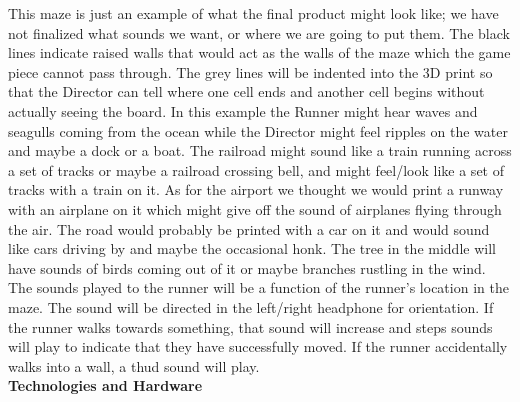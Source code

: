 \documentclass[12pt]{article}
\begin{document}
\indent This maze is just an example of what the final product might look like; we have not finalized what sounds we want, or where we are going to put them.  The black lines indicate raised walls that would act as the walls of the maze which the game piece cannot pass through.  The grey lines will be indented into the 3D print so that the Director can tell where one cell ends and another cell begins without actually seeing the board.  In this example the Runner might hear waves and seagulls coming from the ocean while the Director might feel ripples on the water and maybe a dock or a boat.  The railroad might sound like a train running across a set of tracks or maybe a railroad crossing bell, and might feel/look like a set of tracks with a train on it.  As for the airport we thought we would print a runway with an airplane on it which might give off the sound of airplanes flying through the air.  The road would probably be printed with a car on it and would sound like cars driving by and maybe the occasional honk.  The tree in the middle will have sounds of birds coming out of it or maybe branches rustling in the wind.\\
\indent The sounds played to the runner will be a function of the runner's location in the maze. The sound will be directed in the left/right headphone for orientation. If the runner walks towards something, that sound will increase and steps sounds will play to indicate that they have successfully moved. If the runner accidentally walks into a wall, a thud sound will play.\\

\textbf{\large Technologies and Hardware}\\
\end{document}
